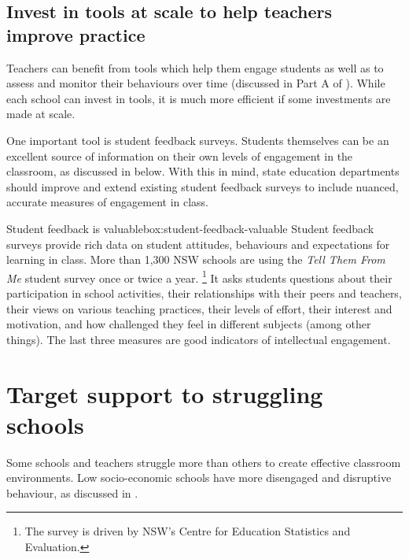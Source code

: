 \documentclass[FrontPage]{grattan}
\begin{document}
\subsection{Invest in tools at scale to help teachers improve practice}\label{subsec:invest-in-tools}
Teachers can benefit from tools which help them engage students as well as to assess and monitor their behaviours over time (discussed in Part A of ).
While each school can invest in tools, it is much more efficient if some investments are made at scale.

One important tool is student feedback surveys. Students themselves can be an excellent source of information on their own levels of engagement in the classroom, as discussed in
 below.
With this in mind, state education departments should improve and extend existing student feedback surveys to include nuanced, accurate measures of engagement in class. 

\setlength{\intextsep}{1.25\baselineskip plus 0.5\baselineskip}\oneraggedpage

\begin{verysmallbox}[!h]{Student feedback is valuable}{box:student-feedback-valuable}%
Student feedback surveys provide rich data on student attitudes, behaviours and expectations for learning in class. More than 1,300 NSW schools are using the \emph{Tell Them From Me} student survey once or twice a year.%
    \footnote{The survey is driven by NSW’s Centre for Education Statistics and Evaluation.}
It asks students questions  about their participation in school activities, their relationships with their peers and teachers, their views on various teaching practices, their levels of effort, their interest and motivation, and how challenged they feel in different subjects (among other things). The last three measures are good indicators of intellectual engagement. 

\end{verysmallbox}
%
%
%
\section{Target support to struggling schools }\label{sec:target-support-struggling-schools}
Some schools and teachers struggle more than others to create effective classroom environments. Low socio-economic schools have more disengaged and disruptive behaviour, as discussed in .
\end{document}
